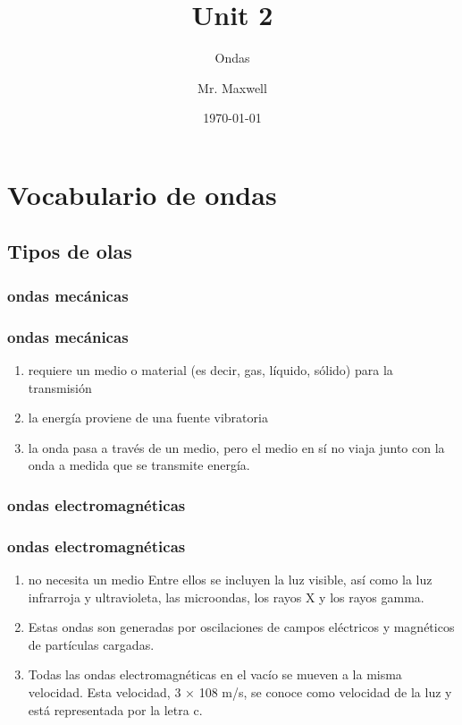 \documentclass{beamer}
\title{Unit 2}
\subtitle{Ondas}
\author{Mr. Maxwell}
\institute{PACS}
\date{\today}
\begin{document}
\frame{\titlepage}
\frame{\tableofcontents}

\section{Vocabulario de ondas}

\subsection{Tipos de olas}

\subsubsection{ondas mecánicas}

\begin{frame}
    \frametitle{ondas mecánicas}
    
    \begin{enumerate}
        \item requiere un medio o material (es decir, gas, líquido, sólido) para la transmisión
        \item la energía proviene de una fuente vibratoria
        \item la onda pasa a través de un medio, pero el medio en sí no viaja junto con la onda a medida que se transmite energía.
    \end{enumerate}
\end{frame}

\subsubsection{ondas electromagnéticas}

\begin{frame}
    \frametitle{ondas electromagnéticas}
    
    \begin{enumerate}
        \item no necesita un medio
        Entre ellos se incluyen la luz visible, así como la luz infrarroja y ultravioleta, las microondas, los rayos X y los rayos gamma.
        \item Estas ondas son generadas por oscilaciones de campos eléctricos y magnéticos de partículas cargadas.
        \item Todas las ondas electromagnéticas en el vacío se mueven a la misma velocidad. Esta velocidad, 3 × 108 m/s, se conoce como velocidad de la luz y está representada por la letra c.
    \end{enumerate}
\end{frame}
\end{document}
